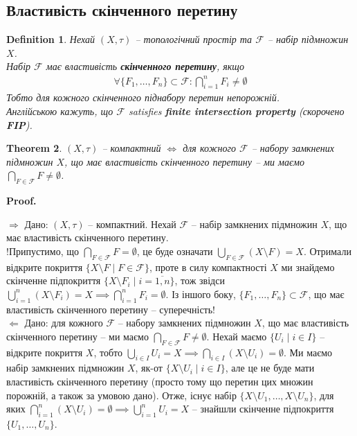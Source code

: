 \documentclass[a4paper, 10pt]{article}
\makeatletter
\def\rightproof{$\boxed{\Rightarrow}$ }
\def\leftproof{$\boxed{\Leftarrow}$ }
\theoremstyle{theoremdd}
\newtheorem{theorem}{Theorem}[subsection]
\newtheorem{definition}[theorem]{Definition}
\renewenvironment{proof}[1][Proof.\\]{\par
\pushQED{\hfill \qed}%
\normalfont \topsep6\p@\@plus6\p@\relax
\trivlist
\item\relax
{\bfseries
#1\@addpunct{.}}\hspace\labelsep\ignorespaces
}{%
\popQED\endtrivlist\@endpefalse
}
\makeatother
\begin{document}
\subsection{Властивість скінченного перетину}
\begin{definition}
Нехай $(X,\tau)$ -- топологічний простір та $\mathcal{F}$ -- набір підмножин $X$.\\
Набір $\mathcal{F}$ має властивість \textbf{скінченного перетину}, якщо
\begin{align*}
\forall \{F_1,\dots,F_n\} \subset \mathcal{F}: \bigcap_{i=1}^n F_i \neq \emptyset
\end{align*}
Тобто для кожного скінченного піднабору перетин непорожній.\\
Англійською кажуть, що $\mathcal{F}$ satisfies \textbf{finite intersection property} (скорочено \textbf{FIP}).
\end{definition}

\begin{theorem}
\label{compactness_using_FIP}
$(X,\tau)$ -- компактний $\iff$ для кожного $\mathcal{F}$ -- набору замкнених підмножин $X$, що має властивість скінченного перетину -- ми маємо $\displaystyle\bigcap_{F \in \mathcal{F}} F \neq \emptyset$.
\end{theorem}

\begin{proof}
\rightproof Дано: $(X,\tau)$ -- компактний. Нехай $\mathcal{F}$ -- набір замкнених підмножин $X$, що має властивість скінченного перетину.\\
!Припустимо, що $\displaystyle\bigcap_{F \in \mathcal{F}} F = \emptyset$, це буде означати $\displaystyle\bigcup_{F \in \mathcal{F}} (X \setminus F) = X$. Отримали відкрите покриття $\{X \setminus F \mid F \in \mathcal{F}\}$, проте в силу компактності $X$ ми знайдемо скінченне підпокриття $\{X \setminus F_i \mid i = \overline{1,n}\}$, тож звідси $\displaystyle\bigcup_{i=1}^n (X \setminus F_i) = X \implies \bigcap_{i=1}^n F_i = \emptyset$. Із іншого боку, $\{F_1,\dots,F_n\} \subset \mathcal{F}$, що має властивість скінченного перетину -- суперечність!
\bigskip \\
\leftproof Дано: для кожного $\mathcal{F}$ -- набору замкнених підмножин $X$, що має властивість скінченного перетину -- ми маємо $\displaystyle\bigcap_{F \in \mathcal{F}} F \neq \emptyset$. Нехай маємо $\{U_i \mid i \in I\}$ -- відкрите покриття $X$, тобто $\displaystyle\bigcup_{i \in I} U_i = X \implies \bigcap_{i \in I} (X \setminus U_i) = \emptyset$. Ми маємо набір замкнених підмножин $X$, як-от $\{X \setminus U_i \mid i \in I\}$, але це не буде мати властивість скінченного перетину (просто тому що перетин цих множин порожній, а також за умовою дано). Отже, існує набір $\{X \setminus U_1, \dots, X \setminus U_n\}$, для яких $\displaystyle\bigcap_{i=1}^n (X \setminus U_i) = \emptyset \implies \bigcup_{i=1}^n U_i = X$ -- знайшли скінченне підпокриття $\{U_1,\dots,U_n\}$.
\end{proof}
\end{document}
